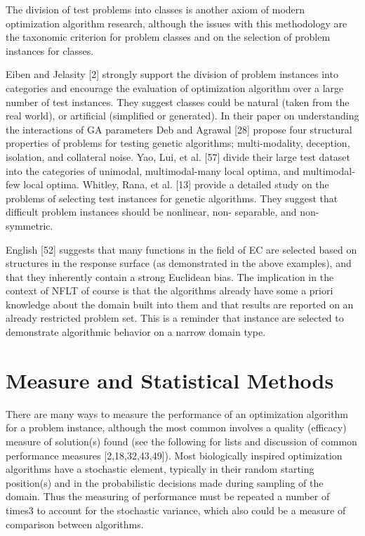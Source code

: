 \documentclass[a4paper, 11pt]{article}
\begin{document}
The division of test problems into classes is another axiom of modern optimization algorithm research, although the issues with this methodology are the taxonomic criterion for problem classes and on the selection of problem instances for classes.

Eiben and Jelasity [2] strongly support the division of problem instances into categories and encourage the evaluation of optimization algorithm over a large number of test instances. They suggest classes could be natural (taken from the real world), or artificial (simplified or generated). In their paper on understanding the interactions of GA parameters Deb and Agrawal [28] propose four structural properties of problems for testing genetic algorithms; multi-modality, deception, isolation, and collateral noise. Yao, Lui, et al. [57] divide their large test dataset into the categories of unimodal,	multimodal-many	local	optima,	and multimodal-few local optima. Whitley, Rana, et al. [13] provide a detailed study on the problems of selecting test instances for genetic algorithms. They suggest that difficult problem instances should be nonlinear, non- separable, and non-symmetric.

English [52] suggests that many functions in the field of EC are selected based on structures in the response surface (as demonstrated in the above examples), and that they inherently contain a strong Euclidean bias. The implication in the context of NFLT of course is that the algorithms already have some a priori knowledge about the domain built into them and that results are reported on an already restricted problem set. This is a reminder that instance are selected to demonstrate algorithmic behavior on a narrow domain type.

% 
% 
\section{Measure and Statistical Methods}
There are many ways to measure the performance of an optimization algorithm for a problem instance, although the most common involves a quality (efficacy) measure of solution(s) found (see the following for lists and discussion of common performance measures [2,18,32,43,49]). Most biologically inspired optimization algorithms have a stochastic element, typically in their random starting position(s) and in the probabilistic decisions made during sampling of the domain. Thus the measuring of performance must be repeated a number of times3 to account for the stochastic variance, which also could be a measure of comparison between algorithms.
\end{document}
